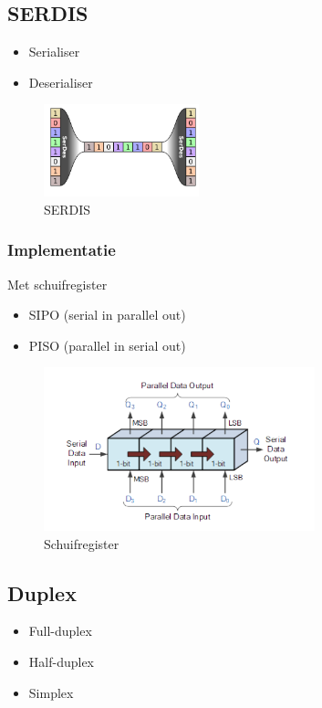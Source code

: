 \documentclass{article}
\begin{document}
\subsection{SERDIS}
\begin{itemize}
    \item Serialiser
    \item Deserialiser
\end{itemize}

\begin{figure}[H]
    \centering
    \includegraphics[width=0.4\textwidth]{Screenshot_20200323_115743.png}
    \caption{SERDIS}
\end{figure}

\subsubsection{Implementatie}
Met schuifregister
\begin{itemize}
    \item SIPO (serial in parallel out)
    \item PISO (parallel in serial out)
\end{itemize}

\begin{figure}[H]
    \centering
    \includegraphics[width=0.7\textwidth]{Screenshot_20200323_115735.png}
    \caption{Schuifregister}
\end{figure}

\subsection{Duplex}
\begin{itemize}
    \item Full-duplex
    \item Half-duplex
    \item Simplex
\end{itemize}
\end{document}
